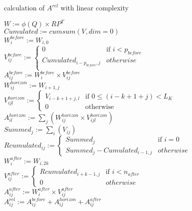 \begin{algorithm*}
	\caption{calculation of $A^{rel}$ with linear complexity}
	\label{alg:A_rel}
	$W := \phi(Q) \times RP^T$\\
	$Cumulated := cumsum(V, dim=0)$\\
	$W^{before}_{i} := W_{i,0}$\\
	$V^{before}_{ij} := 
	\begin{cases}
		0 & \text{if }i < p_{before}\\
		Cumulated_{i-p_{before}, j} & otherwise\\
	\end{cases}$\\
	$A^{before}_{ij} := W^{before}_{i} \times V^{before}_{ij}$\\
	$W^{horizon}_{ij} := W_{i+1,j}$\\
	$V^{horizon}_{ijl} :=
	\begin{cases}
		V_{i-k+1+j, l} & \text{if }0 \leq (i-k+1+j) < L_K\\
		0 & \text{otherwise} 
	\end{cases}$\\
	$A^{horizon}_{il} := \sum_j \left( W^{horizon}_{ij} \times V^{horizon}_{ijl} \right)$\\
	$Summed_{j} := \sum_i \left( V_{ij}\right)$\\
	$Rcumulated_{ij} := 
	\begin{cases}
		Summed_{j} & \text{if }i=0\\
		Summed_{j} - Cumulated_{i-1,j} & otherwise
	\end{cases}$\\
	$W^{after}_{i} := W_{i, 2k}$\\
	$V^{after}_{ij} := 
	\begin{cases}
		Rcumulated_{i+k-1,j} & \text{if }i<n_{after}\\
		0 & otherwise
	\end{cases}$\\
	$A^{after}_{ij} := W^{after}_{i} \times V^{after}_{ij}$\\
	$A^{rel}_{ij} := A^{before}_{ij} + A^{horizon}_{ij} + A^{after}_{ij}$
\end{algorithm*}

\endinput